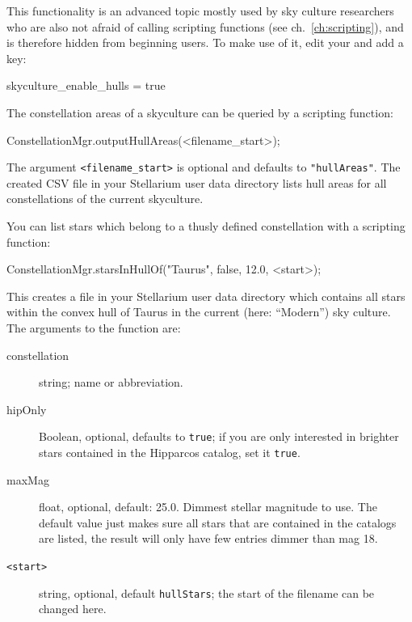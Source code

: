 This functionality is an advanced topic mostly used by sky culture researchers \citep[e.g.][94-98]{Hoffmann2017a} who are also not afraid of calling scripting functions (see ch.~\ref{ch:scripting}), 
and is therefore hidden from beginning users. To make use of it, edit your  and add a key:
\begin{configfile}
[gui]
skyculture_enable_hulls = true 
\end{configfile}


The constellation areas of a skyculture can be queried by a scripting function:
\begin{script}
ConstellationMgr.outputHullAreas(<filename_start>);
\end{script}
The argument \texttt{<filename\_start>} is optional and defaults to \texttt{"hullAreas"}. 
The created CSV file  in your Stellarium user data directory lists hull areas for all constellations of the current skyculture. 


You can list stars which belong to a thusly defined constellation with a scripting function:
\begin{script}
ConstellationMgr.starsInHullOf("Taurus", false, 12.0, <start>);
\end{script}
This creates a file  in your Stellarium user data directory which contains all stars within the convex hull of Taurus in the current (here: ``Modern'') sky culture. 
The arguments to the function are:
\begin{description}
\item[constellation] string; name or abbreviation.
\item[hipOnly] Boolean, optional, defaults to \texttt{true}; if you are only interested in brighter stars contained in the Hipparcos catalog, set it \texttt{true}. 
\item[maxMag] float, optional, default: 25.0. Dimmest stellar magnitude to use. The default value just makes sure all stars that are contained in the catalogs are listed, 
              the result will only have few entries dimmer than mag 18.
\item[\texttt{<start>}] string, optional, default \texttt{hullStars}; the start of the filename can be changed here. 
\end{description}

